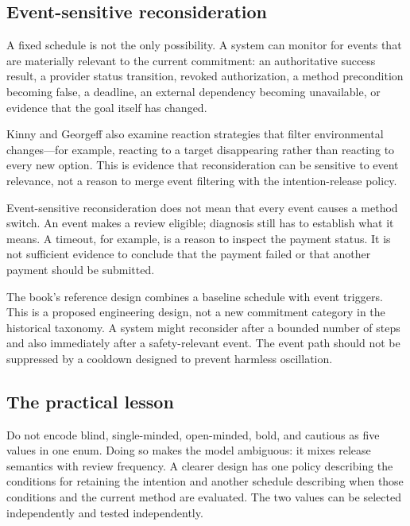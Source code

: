 
\subsection{Event-sensitive reconsideration}

A fixed schedule is not the only possibility. A system can monitor for events that are materially relevant to the current commitment: an authoritative success result, a provider status transition, revoked authorization, a method precondition becoming false, a deadline, an external dependency becoming unavailable, or evidence that the goal itself has changed.

Kinny and Georgeff also examine reaction strategies that filter environmental changes—for example, reacting to a target disappearing rather than reacting to every new option. This is evidence that reconsideration can be sensitive to event relevance, not a reason to merge event filtering with the intention-release policy.\autocite{kinny1991commitment}

Event-sensitive reconsideration does not mean that every event causes a method switch. An event makes a review eligible; diagnosis still has to establish what it means. A timeout, for example, is a reason to inspect the payment status. It is not sufficient evidence to conclude that the payment failed or that another payment should be submitted.

The book's reference design combines a baseline schedule with event triggers. This is a proposed engineering design, not a new commitment category in the historical taxonomy. A system might reconsider after a bounded number of steps and also immediately after a safety-relevant event. The event path should not be suppressed by a cooldown designed to prevent harmless oscillation.

\subsection{The practical lesson}

Do not encode blind, single-minded, open-minded, bold, and cautious as five values in one enum. Doing so makes the model ambiguous: it mixes release semantics with review frequency. A clearer design has one policy describing the conditions for retaining the intention and another schedule describing when those conditions and the current method are evaluated. The two values can be selected independently and tested independently.

